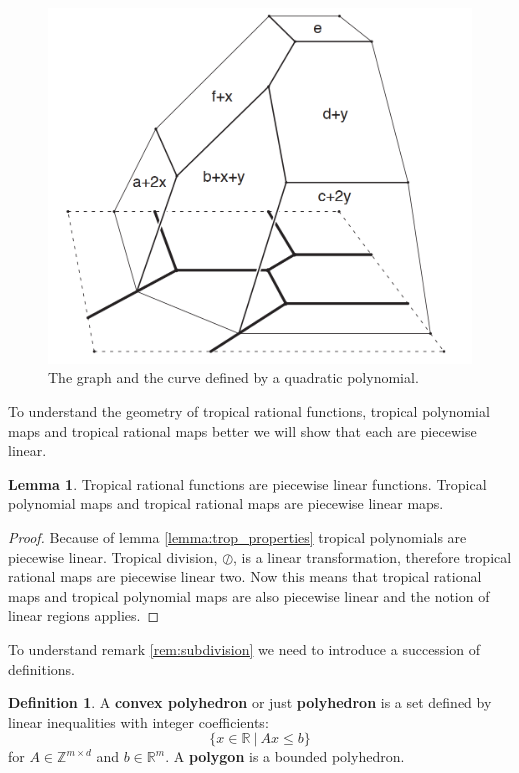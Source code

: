 \documentclass{article}
\theoremstyle{definition}
\newtheorem{lemma}[theorem]{Lemma}
\newtheorem{definition}[theorem]{Definition}
\newcommand*{\figuretitle}[1]{%
    {\centering%
    \textbf{#1}%
    \par\medskip}%
}
\begin{document}
\begin{figure}[H]
\centering
\includegraphics[scale=0.5]{graphics/quad_trop_pol_proj.PNG}
\caption{The graph and the curve defined by a quadratic polynomial.\cite[p.~22]{maclagan2015introduction}}
\label{fig:quad_trop_var}
\end{figure}

To understand the geometry of tropical rational functions, tropical polynomial maps and tropical rational maps better we will show that each are piecewise linear.


\begin{lemma}
Tropical rational functions are piecewise linear functions. Tropical polynomial maps and tropical rational maps are piecewise linear maps.
\end{lemma}
\begin{proof}
Because of lemma \ref{lemma:trop_properties} tropical polynomials are piecewise linear. Tropical division, $\oslash$, is a linear transformation, therefore tropical rational maps are piecewise linear two. Now this means that tropical rational maps and tropical polynomial maps are also piecewise linear and the notion of linear regions applies.
\end{proof}

To understand remark \ref{rem:subdivision} we need to introduce a succession of definitions.

\begin{definition}\hspace{1sp}\cite[p.~4]{zhang2018tropical}
A \textbf{convex polyhedron} or just \textbf{polyhedron} is a set defined by linear inequalities with integer coefficients:
$$\{x \in \mathbb{R} \ | \ Ax \leq b \}$$
for $A \in \mathbb{Z}^{m \times d}$ and $b \in \mathbb{R}^{m}$. A \textbf{polygon} is a bounded polyhedron.
\end{definition}
\end{document}
